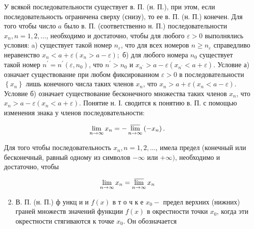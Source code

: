 \documentclass[10pt]{article}
\begin{document}
У всякой последовательности существует в. П. (н. П.), при этом, если последовательность ограничена сверху (снизу), то ее в. П. (н. П.) конечен. Для того чтобы число $a$ было в. П. (соответственно н. П.) последовательности $x_{n}, n=1,2, \ldots$, необходимо и достаточно, чтобы для любого $\varepsilon>0$ выполнялись условия: a) существует такой номер $n_{\varepsilon}$, что для всех номеров $n \geqslant n_{\varepsilon}$ справедливо неравенство $x_{n}<a+\varepsilon\left(x_{n}>a-\varepsilon\right) ;$ б) для любого номера $n_{0}$ существует такой номер $n^{\prime}=n^{\prime}\left(\varepsilon, n_{0}\right)$, что $n^{\prime}>n_{0}$ и $x_{n^{\prime}}>a-\varepsilon\left(x_{n^{\prime}}<a+\varepsilon\right)$. Условие а) означает существование при любом фиксированном $\varepsilon>0$ в последовательности $\left\{x_{n}\right\}$ лишь конечного числа таких членов $x_{n}$, что $x_{n}>a+\varepsilon\left(x_{n}<a-\varepsilon\right)$. Условие б) означает существование бесконечного множества таких членов $x_{n}$, что $x_{n}>a-\varepsilon\left(x_{n}<a+\varepsilon\right)$. Понятие н. І. сводится к понятию в. П. с помощью изменения знака у членов последовательности:



\[

\lim _{n \rightarrow \infty} x_{n}=-\varlimsup_{n \rightarrow \infty}\left(-x_{n}\right) .

\]



Для того чтобы последовательность $x_{n}, n=1,2, \ldots$, имела предел (конечный или бесконечный, равный одному из символов $-\infty$ или $+\infty)$, необходимо и достаточно, чтобы



\[

\lim _{n \rightarrow \infty} x_{n}=\varlimsup_{n \rightarrow \infty} x_{n}

\]



\begin{enumerate}

  \setcounter{enumi}{1}

  \item В. П. (н. П.) ф ункц и и $f(x)$ в т о ч к е $x_{0}-$ предел верхних (нижних) граней множеств значений функции $f(x)$ в окрестности точки $x_{0}$, когда эти окрестности стягиваются к точке $x_{0}$. Он обозначается

\end{enumerate}
\end{document}
